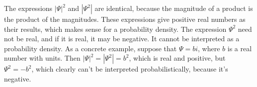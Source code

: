 The expressions $|\Psi|^2$ and $|\Psi^2|$ are identical, because the
magnitude of a product is the product of the magnitudes. These expressions
give positive real numbers as their results, which makes sense for
a probability density. The expression $\Psi^2$ need not be real, and
if it is real, it may be negative. It cannot be interpreted as a probability
density. As a concrete example, suppose that $\Psi= b i$, where $b$ is a real
number with units.
Then $|\Psi|^2=|\Psi^2|=b^2$, which is real and positive, but $\Psi^2=-b^2$,
which clearly can't be interpreted probabilistically, because it's negative.
